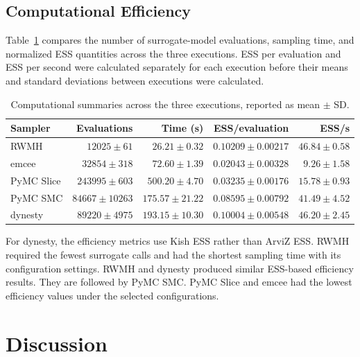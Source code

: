 \subsection{Computational Efficiency}

Table~\ref{tab:efficiency-results} compares the number of surrogate-model evaluations, sampling time, and normalized ESS quantities across the three executions. ESS per evaluation and ESS per second were calculated separately for each execution before their means and standard deviations between executions were calculated.

\begin{table}[htbp]
\centering
\small
\setlength{\tabcolsep}{4pt}
\caption{Computational summaries across the three executions, reported as mean $\pm$ SD.}
\label{tab:efficiency-results}
\begin{tabular}{@{}lrrrr@{}}
\toprule
Sampler
  & Evaluations
  & Time (s)
  & ESS/evaluation
  & ESS/s \\
\midrule
RWMH
  & $12025 \pm 61$
  & $26.21 \pm 0.32$
  & $0.10209 \pm 0.00217$
  & $46.84 \pm 0.58$ \\

emcee
  & $32854 \pm 318$
  & $72.60 \pm 1.39$
  & $0.02043 \pm 0.00328$
  & $9.26 \pm 1.58$ \\

PyMC Slice
  & $243995 \pm 603$
  & $500.20 \pm 4.70$
  & $0.03235 \pm 0.00176$
  & $15.78 \pm 0.93$ \\

PyMC SMC
  & $84667 \pm 10263$
  & $175.57 \pm 21.22$
  & $0.08595 \pm 0.00792$
  & $41.49 \pm 4.52$ \\

dynesty
  & $89220 \pm 4975$
  & $193.15 \pm 10.30$
  & $0.10004 \pm 0.00548$
  & $46.20 \pm 2.45$ \\
\bottomrule
\end{tabular}
\end{table}

For dynesty, the efficiency metrics use Kish ESS rather than ArviZ ESS. RWMH required the fewest surrogate calls and had the shortest sampling time with its configuration settings. RWMH and dynesty produced similar ESS-based efficiency results. They are followed by PyMC SMC. PyMC Slice and emcee had the lowest efficiency values under the selected configurations.

\section{Discussion}
\label{sec:eval-discussion}

